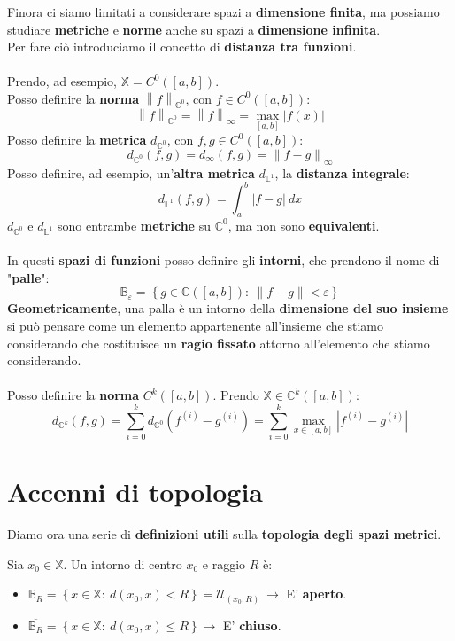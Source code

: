 \documentclass[a4paper, oneside]{article}
\newcommand\X{\mathbb{X}}
\newcommand\C{\mathbb{C}}
\newcommand\B{\mathbb{B}}
\begin{document}
\noindent Finora ci siamo limitati a considerare spazi a \textbf{dimensione finita}, ma possiamo studiare \textbf{metriche} e \textbf{norme} anche su 
spazi a \textbf{dimensione infinita}.\\
Per fare ciò introduciamo il concetto di \textbf{distanza tra funzioni}.\\\\
Prendo, ad esempio, $\X = C^0\left([a,b]\right)$.\\
Posso definire la \textbf{norma} $\left\lVert f\right\rVert_{\C^0}$, con $f\in C^0\left([a,b]\right)$:
\[\left\lVert f\right\rVert_{\C^0} = \left\lVert f\right\rVert_{\infty} = \max_{[a,b]} |f(x)|\]
Posso definire la \textbf{metrica} $d_{\C^0}$, con $f,g\in C^0\left([a,b]\right)$:
\[d_{\C^0}(f,g) = d_\infty (f,g) = \left\lVert f-g\right\rVert_\infty \]
Posso definire, ad esempio, un'\textbf{altra metrica} $d_{\mathbb{L}^1}$, la \textbf{distanza integrale}:
\[d_{\mathbb{L}^1} (f,g) = \int_{a}^{b} |f-g| \ dx\]
$d_{\C^0}$ e $d_{\mathbb{L}^1}$ sono entrambe \textbf{metriche} su $\C^0$, ma non sono \textbf{equivalenti}.\\\\

\noindent In questi \textbf{spazi di funzioni} posso definire gli \textbf{intorni}, che prendono il nome di "\textbf{palle}":
\[\B_\varepsilon = \left\{g\in\C\left([a,b]\right): \ \left\lVert f-g\right\rVert < \varepsilon \right\}\]
\textbf{Geometricamente}, una palla è un intorno della \textbf{dimensione del suo insieme} si può pensare come un elemento appartenente all'insieme che stiamo considerando che costituisce un \textbf{ragio fissato} attorno all'elemento che stiamo considerando.\\\\
Posso definire la \textbf{norma} $C^k\left([a,b]\right)$. Prendo $\X\in\C^k\left([a,b]\right)$:
\[d_{\C^k} (f,g) = \sum_{i=0}^{k} d_{\C^0} \left(f^{(i)} - g^{(i)}\right) = \sum_{i=0}^{k} \max_{x\in[a,b]} \left|f^{(i)} - g^{(i)}\right|\]

\newpage

\section{Accenni di topologia}
Diamo ora una serie di \textbf{definizioni utili} sulla \textbf{topologia degli spazi metrici}. 

\begin{definition}
    Sia $x_0\in\X$. Un intorno di centro $x_0$ e raggio $R$ è:
    \begin{itemize}
        \item $\B_R = \left\{x\in\X: \ d(x_0,x) < R\right\} = \mathcal{U}_{(x_0,R)} \ \rightarrow$ E' \textbf{aperto}.
        \item $\overline{\B_R} = \left\{x\in\X: \ d(x_0,x) \leq R\right\} \rightarrow$ E' \textbf{chiuso}.
    \end{itemize}
\end{definition}
\end{document}
